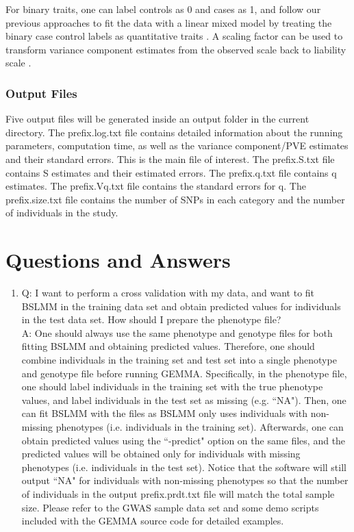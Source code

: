 \documentclass[11pt]{article}
\begin{document}
For binary traits, one can label controls as 0 and cases as 1, and follow our previous approaches to fit the data with a linear mixed model by treating the binary case control labels as quantitative traits \cite{Zhou:2013}. A scaling factor can be used to transform variance component estimates from the observed scale back to liability scale \cite{Zhou:2013}.


\subsubsection{Output Files}
Five output files will be generated inside an output folder in the current directory. The prefix.log.txt file contains detailed information about the running parameters, computation time, as well as the variance component/PVE estimates and their standard errors. This is the main file of interest. The prefix.S.txt file contains S estimates and their estimated errors. The prefix.q.txt file contains q estimates. The prefix.Vq.txt file contains the standard errors for q. The prefix.size.txt file contains the number of SNPs in each category and the number of individuals in the study.





\clearpage
\newpage
\section{Questions and Answers}
\begin{enumerate}
\item Q: I want to perform a cross validation with my data, and want to fit BSLMM in the training data set and obtain predicted values for individuals in the test data set. How should I prepare the phenotype file?\\
A: One should always use the same phenotype and genotype files for both fitting BSLMM and obtaining predicted values. Therefore, one should combine individuals in the training set and test set into a single phenotype and genotype file before running GEMMA. Specifically, in the phenotype file, one should label individuals in the training set with the true phenotype values, and label individuals in the test set as missing (e.g. ``NA"). Then, one can fit BSLMM with the files as BSLMM only uses individuals with non-missing phenotypes (i.e. individuals in the training set). Afterwards, one can obtain predicted values using the ``-predict" option on the same files, and the predicted values will be obtained only for individuals with missing phenotypes (i.e. individuals in the test set). Notice that the software will still output ``NA" for individuals with non-missing phenotypes so that the number of individuals in the output prefix.prdt.txt file will match the total sample size. Please refer to the GWAS sample data set and some demo scripts included with the GEMMA source code for detailed examples.
\end{enumerate}
\end{document}
